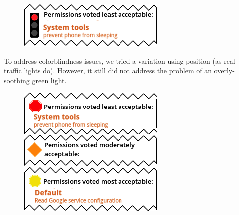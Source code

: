\documentclass[11pt]{article}
\begin{document}
\begin{figure}
\begin{center}
\includegraphics[width=.9\linewidth]{candidate-img/traffic/trafficR3.png}
\end{center}
\end{figure}

To address colorblindness issues, we tried a variation using position
(as real traffic lights do). However, it still did not address
the problem of an overly-soothing green light. \\



\begin{figure}
\begin{center}
\includegraphics[width=.9\linewidth]{candidate-img/traffic/trafficR4.png}
\end{center}
\end{figure}
\end{document}
